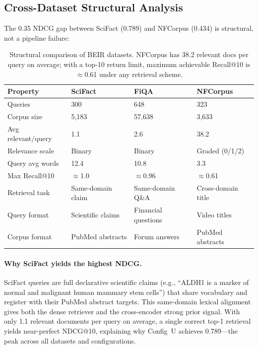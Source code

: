 \documentclass[11pt]{article}
\begin{document}
\subsection{Cross-Dataset Structural Analysis}
\label{sec:eval:crossdataset}

The 0.35 NDCG gap between SciFact (0.789) and NFCorpus (0.434) is structural, not a
pipeline failure:

\begin{table}[H]
\centering
\small
\begin{tabular}{lp{3cm}p{3cm}p{3cm}}
\toprule
\textbf{Property} & \textbf{SciFact} & \textbf{FiQA} & \textbf{NFCorpus} \\
\midrule
Queries & 300 & 648 & 323 \\
Corpus size & 5,183 & 57,638 & 3,633 \\
Avg relevant/query & 1.1 & 2.6 & 38.2 \\
Relevance scale & Binary & Binary & Graded (0/1/2) \\
Query avg words & 12.4 & 10.8 & 3.3 \\
Max Recall@10 & $\approx$1.0 & $\approx$0.96 & $\approx$0.61 \\
Retrieval task & Same-domain claim & Same-domain Q\&A & Cross-domain title \\
Query format & Scientific claims & Financial questions & Video titles \\
Corpus format & PubMed abstracts & Forum answers & PubMed abstracts \\
\bottomrule
\end{tabular}
\caption{Structural comparison of BEIR datasets. NFCorpus has 38.2 relevant docs per
query on average; with a top-10 return limit, maximum achievable Recall@10 is $\approx$0.61
under any retrieval scheme.}
\label{tab:dataset-struct}
\end{table}

\paragraph{Why SciFact yields the highest NDCG.}
SciFact queries are full declarative scientific claims (e.g., ``ALDH1 is a marker of
normal and malignant human mammary stem cells'') that share vocabulary and register
with their PubMed abstract targets. This same-domain lexical alignment gives both the
dense retriever and the cross-encoder strong prior signal. With only 1.1 relevant
documents per query on average, a single correct top-1 retrieval yields near-perfect
NDCG@10, explaining why Config~U achieves 0.789---the peak across all datasets and
configurations.
\end{document}

